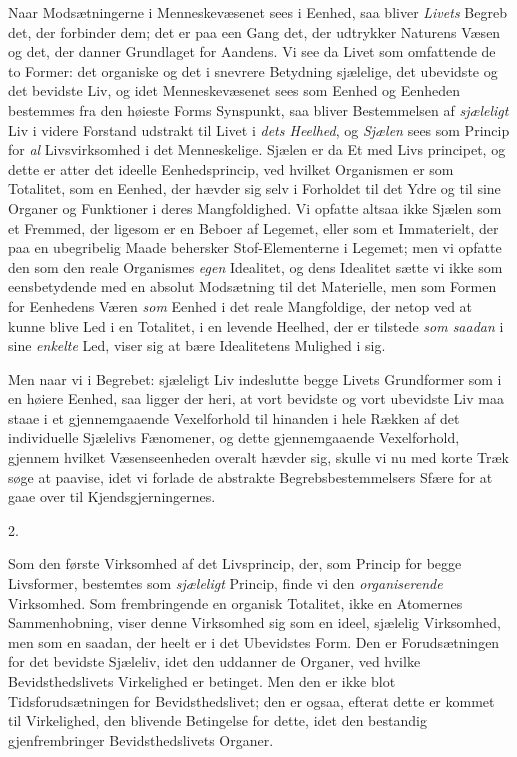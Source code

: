 \documentclass[12pt,a4paper,openany]{book}
\newcommand{\secnum}[1]{\par\begin{center}#1\end{center}\par\nobreak}
\newcommand{\opage}[1]{\marginnote{\footnotesize\textit{[#1]}}}
\begin{document}
Naar Modsætningerne i Menneskevæsenet sees i Eenhed,
saa bliver \emph{Livets} Begreb det, der forbinder dem; det er
paa een Gang det, der udtrykker Naturens Væsen og det,
der danner Grundlaget for Aandens. Vi see da Livet som
omfattende de to Former: det organiske og det i snevrere
Betydning sjælelige, det ubevidste og det bevidste Liv, og idet
Menneskevæsenet sees som Eenhed og Eenheden bestemmes fra
den høieste Forms Synspunkt, saa bliver Bestemmelsen af
\emph{sjæleligt} Liv i videre Forstand udstrakt til Livet i \emph{dets
Heelhed}, og \emph{Sjælen} sees som Princip for \emph{al} Livsvirksomhed
i det Menneskelige. Sjælen er da Et med Livs%
\opage{46}principet, og dette er atter det ideelle Eenhedsprincip, ved
hvilket Organismen er som Totalitet, som en Eenhed, der
hævder sig selv i Forholdet til det Ydre og til sine Organer
og Funktioner i deres Mangfoldighed. Vi opfatte altsaa
ikke Sjælen som et Fremmed, der ligesom er en Beboer af
Legemet, eller som et Immaterielt, der paa en ubegribelig
Maade behersker Stof-Elementerne i Legemet; men vi opfatte
den som den reale Organismes \emph{egen} Idealitet, og dens
Idealitet sætte vi ikke som eensbetydende med en absolut
Modsætning til det Materielle, men som Formen for Eenhedens
Væren \emph{som} Eenhed i det reale Mangfoldige, der
netop ved at kunne blive Led i en Totalitet, i en levende
Heelhed, der er tilstede \emph{som saadan} i sine \emph{enkelte} Led,
viser sig at bære Idealitetens Mulighed i sig.

Men naar vi i Begrebet: sjæleligt Liv indeslutte begge
Livets Grundformer som i en høiere Eenhed, saa ligger der
heri, at vort bevidste og vort ubevidste Liv maa staae i et
gjennemgaaende Vexelforhold til hinanden i hele Rækken af
det individuelle Sjælelivs Fænomener, og dette gjennemgaaende
Vexelforhold, gjennem hvilket Væsenseenheden overalt hævder
sig, skulle vi nu med korte Træk søge at paavise, idet vi
forlade de abstrakte Begrebsbestemmelsers Sfære for at gaae
over til Kjendsgjerningernes.

\secnum{2.}

Som den første Virksomhed af det Livsprincip, der, som
Princip for begge Livsformer, bestemtes som \emph{sjæleligt} Princip,
finde vi den \emph{organiserende} Virksomhed. Som frembringende
en organisk Totalitet, ikke en Atomernes Sammenhobning,
viser denne Virksomhed sig som en ideel, sjælelig
Virksomhed, men som en saadan, der heelt er i det Ubevidstes
Form. Den er Forudsætningen for det bevidste
Sjæleliv, idet den uddanner de Organer, ved hvilke Bevidsthedslivets
Virkelighed er betinget. Men den er ikke blot
Tidsforudsætningen for Bevidsthedslivet; den er ogsaa, efterat
dette er kommet til Virkelighed, den blivende Betingelse
\opage{47}for dette, idet den bestandig gjenfrembringer Bevidsthedslivets
Organer.
\end{document}
